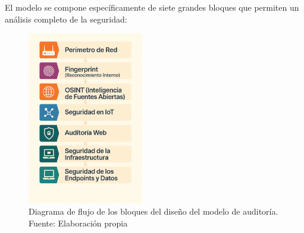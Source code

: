 \documentclass[a4paper, 10pt]{article}
\begin{document}
\par\vspace{0.5cm}

El modelo se compone específicamente de siete grandes bloques que permiten un análisis completo de la seguridad:

\begin{figure}[H]
    \centering
    \includegraphics[width=0.45\textwidth]{images/diseno.png}
    \caption{Diagrama de flujo de los bloques del diseño del modelo de auditoría. Fuente: Elaboración propia}
    \label{fig:diseno_modelo_auditoria}
\end{figure}
\end{document}
